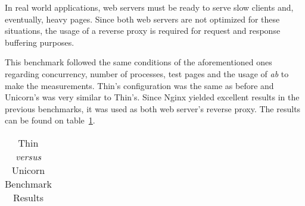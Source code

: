 In real world applications, web servers must be ready to serve slow clients and, eventually, heavy pages. Since both web servers are not optimized for these situations, the usage of a reverse proxy is required for request and response buffering purposes.

This benchmark followed the same conditions of the aforementioned ones regarding concurrency, number of processes, test pages and the usage of \textit{ab} to make the measurements. Thin's configuration was the same as before and Unicorn's was very similar to Thin's. Since Nginx yielded excellent results in the previous benchmarks, it was used as both web server's reverse proxy. The results can be found on table~\ref{tab:thin_unicorn_benchmark}.

\begin{table}[h!t]
  \centering
  \caption{Thin \textit{versus} Unicorn Benchmark Results}
  \label{tab:thin_unicorn_benchmark}
  
  \begin{tabular}{c|c|c|c|c|c}


\end{tabular}
\end{table}
